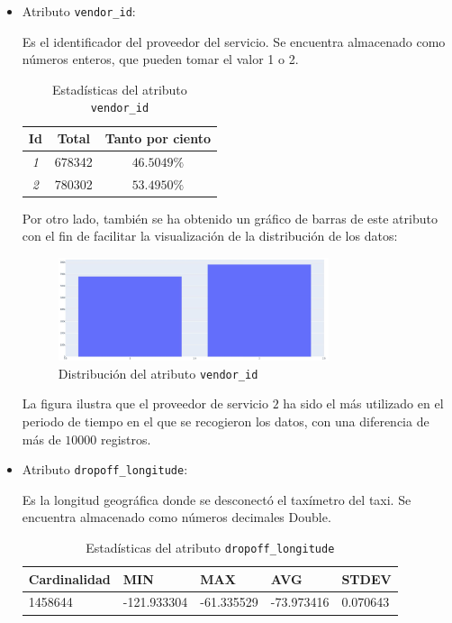 \documentclass[12pt]{article}
\begin{document}
\begin{itemize}
\item Atributo \texttt{vendor\_id}:
    
Es el identificador del proveedor del servicio. Se encuentra almacenado como números enteros, que pueden tomar el valor   1 o 2.

\begin{table}[H]
\centering
\begin{tabular}{|c|c|c|}
\hline
Id         & Total     & Tanto por ciento  \\ \hline
\textit{1}  & 678342     & $46.5049\%$      \\ \hline
\textit{2}  & 780302   & $53.4950\%$      \\ \hline
\end{tabular}
\caption{Estadísticas del atributo \texttt{vendor\_id}}
\end{table}

Por otro lado, también se ha obtenido un gráfico de barras de este atributo con el fin de facilitar la visualización de la distribución de los datos:

\begin{figure}[H]
    \centering
    \includegraphics[width=0.75\textwidth]{vendor_id.PNG}
    \caption{Distribución del atributo \texttt{vendor\_id}}
    \label{fig:passenger_count}
\end{figure}

La figura ilustra que el proveedor de servicio $2$ ha sido el más utilizado en el periodo de tiempo en el que se recogieron los datos, con una diferencia de más de $10000$ registros.

    \item Atributo \texttt{dropoff\_longitude}:

Es la longitud geográfica donde se desconectó el taxímetro del taxi. Se encuentra almacenado como números decimales Double.

\begin{table}[H]
\centering
\begin{tabular}{|p{2.5cm}|p{2.5cm}|p{2.5cm}|p{2.5cm}|p{2.5cm}|}
\hline
Cardinalidad & MIN         & MAX        & AVG        & STDEV    \\ \hline
1458644      & -121.933304 & -61.335529 & -73.973416 & 0.070643 \\ \hline
\end{tabular}
\caption{Estadísticas del atributo \texttt{dropoff\_longitude}}
\end{table}


\end{itemize}
\end{document}
